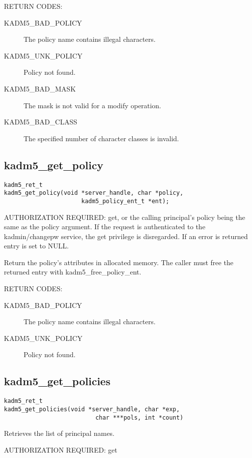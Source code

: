 RETURN CODES: 

\begin{description}
\item[KADM5_BAD_POLICY] The policy name contains illegal characters.
\item[KADM5_UNK_POLICY] Policy not found.
\item[KADM5_BAD_MASK] The mask is not valid for a modify
operation.
\item[KADM5_BAD_CLASS] The specified number of character classes
is invalid.
\end{description}

\subsection{kadm5_get_policy}

\begin{verbatim}
kadm5_ret_t
kadm5_get_policy(void *server_handle, char *policy,
                      kadm5_policy_ent_t *ent); 
\end{verbatim}

AUTHORIZATION REQUIRED: get, or the calling principal's policy being
the same as the policy argument.  If the request is authenticated to
the kadmin/changepw service, the get privilege is disregarded.
If an error is returned entry is set to NULL.

Return the policy's attributes in allocated memory.  The caller must
free the returned entry with kadm5_free_policy_ent.

RETURN CODES: 

\begin{description}
\item[KADM5_BAD_POLICY] The policy name contains illegal characters.
\item[KADM5_UNK_POLICY] Policy not found.
\end{description}

\subsection{kadm5_get_policies}

\begin{verbatim}
kadm5_ret_t
kadm5_get_policies(void *server_handle, char *exp,
                          char ***pols, int *count)
\end{verbatim}

Retrieves the list of principal names.  

AUTHORIZATION REQUIRED: get


